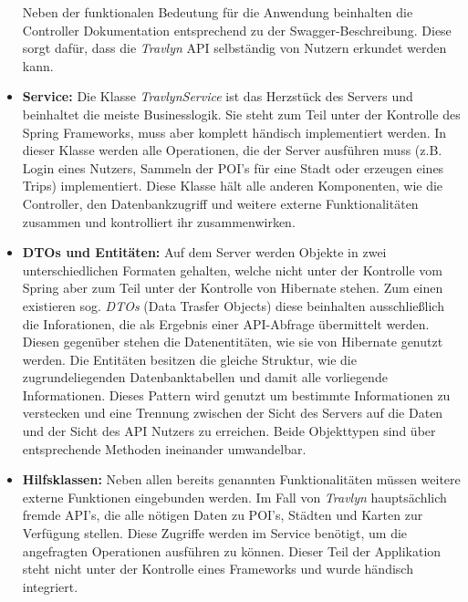 \begin{itemize}
		Neben der funktionalen Bedeutung für die Anwendung beinhalten die Controller Dokumentation entsprechend zu der Swagger-Beschreibung. Diese sorgt dafür, dass die \textit{Travlyn} API selbständig von Nutzern erkundet werden kann.
		\item  \textbf{Service:} Die Klasse \textit{TravlynService} ist das Herzstück des Servers und beinhaltet die meiste Businesslogik. Sie steht zum Teil unter der Kontrolle des Spring Frameworks, muss aber komplett händisch implementiert werden. In dieser Klasse werden alle Operationen, die der Server ausführen muss (z.B. Login eines Nutzers, Sammeln der POI's für eine Stadt oder erzeugen eines Trips) implementiert. Diese Klasse hält alle anderen Komponenten, wie die Controller, den Datenbankzugriff und weitere externe Funktionalitäten zusammen und kontrolliert ihr zusammenwirken.
		\item  \textbf{DTOs und Entitäten:} Auf dem Server werden Objekte in zwei unterschiedlichen Formaten gehalten, welche nicht unter der Kontrolle vom Spring aber zum Teil unter der Kontrolle von Hibernate stehen. Zum einen existieren sog. \textit{DTOs} (Data Trasfer Objects) diese beinhalten ausschließlich die Inforationen, die als Ergebnis einer API-Abfrage übermittelt werden. Diesen gegenüber stehen die Datenentitäten, wie sie von Hibernate genutzt werden. Die Entitäten besitzen die gleiche Struktur, wie die zugrundeliegenden Datenbanktabellen und damit alle vorliegende Informationen. Dieses Pattern wird genutzt um bestimmte Informationen zu verstecken und eine Trennung zwischen der Sicht des Servers auf die Daten und der Sicht des API Nutzers zu erreichen. Beide Objekttypen sind über entsprechende Methoden ineinander umwandelbar.
		\item \textbf{Hilfsklassen:} Neben allen bereits genannten Funktionalitäten müssen weitere externe Funktionen eingebunden werden. Im Fall von \textit{Travlyn} hauptsächlich fremde API's, die alle nötigen Daten zu POI's, Städten und Karten zur Verfügung stellen. Diese Zugriffe werden im Service benötigt, um die angefragten Operationen ausführen zu können. Dieser Teil der Applikation steht nicht unter der Kontrolle eines Frameworks und wurde händisch integriert. 
	\end{itemize}
	

